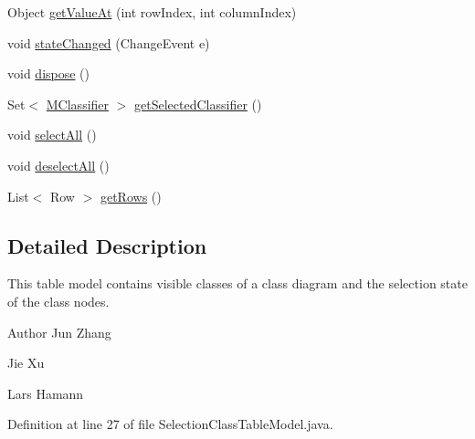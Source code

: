 \begin{DoxyCompactItemize}
Object \hyperlink{classorg_1_1tzi_1_1use_1_1gui_1_1views_1_1selection_1_1classselection_1_1_selection_class_table_model_a034020cca1af1b2c00873ac0376e8c0e}{get\-Value\-At} (int row\-Index, int column\-Index)
\item 
void \hyperlink{classorg_1_1tzi_1_1use_1_1gui_1_1views_1_1selection_1_1classselection_1_1_selection_class_table_model_ae8862f292c0073e29b58490cb0c3a378}{state\-Changed} (Change\-Event e)
\item 
void \hyperlink{classorg_1_1tzi_1_1use_1_1gui_1_1views_1_1selection_1_1classselection_1_1_selection_class_table_model_a9816804e5cbd382df0576bff2e869252}{dispose} ()
\item 
Set$<$ \hyperlink{interfaceorg_1_1tzi_1_1use_1_1uml_1_1mm_1_1_m_classifier}{M\-Classifier} $>$ \hyperlink{classorg_1_1tzi_1_1use_1_1gui_1_1views_1_1selection_1_1classselection_1_1_selection_class_table_model_a21a247a4aedbe8ef83e76cf716b710d3}{get\-Selected\-Classifier} ()
\item 
void \hyperlink{classorg_1_1tzi_1_1use_1_1gui_1_1views_1_1selection_1_1classselection_1_1_selection_class_table_model_aee922d064d7e80728e05b4f6f708fde3}{select\-All} ()
\item 
void \hyperlink{classorg_1_1tzi_1_1use_1_1gui_1_1views_1_1selection_1_1classselection_1_1_selection_class_table_model_a0f00cc94b8b238d0bb459c702f7527d0}{deselect\-All} ()
\item 
List$<$ Row $>$ \hyperlink{classorg_1_1tzi_1_1use_1_1gui_1_1views_1_1selection_1_1classselection_1_1_selection_class_table_model_a218c36713792c1cf6feb6f3d271abf12}{get\-Rows} ()
\end{DoxyCompactItemize}


\subsection{Detailed Description}
This table model contains visible classes of a class diagram and the selection state of the class nodes. \begin{DoxyAuthor}{Author}
Jun Zhang 

Jie Xu 

Lars Hamann 
\end{DoxyAuthor}


Definition at line 27 of file Selection\-Class\-Table\-Model.\-java.



